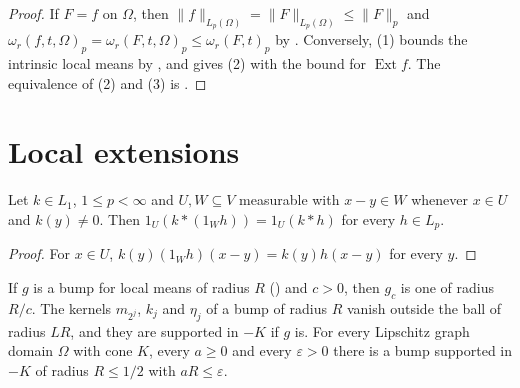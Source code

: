 \begin{proof}
\leanok
If $F = f$ on $\Omega$, then $\|f\|_{L_p(\Omega)} = \|F\|_{L_p(\Omega)} \leq \|F\|_p$ and
$\omega_r(f, t, \Omega)_p = \omega_r(F, t, \Omega)_p \leq \omega_r(F, t)_p$ by
. Conversely, (1) bounds the intrinsic local means by
, and  gives (2) with the bound for
$\operatorname{Ext} f$. The equivalence of (2) and (3) is .
\end{proof}

\section{Local extensions}

\begin{lemma}
\label{lem:support-principle-two}
\leanok
{}
Let $k \in L_1$, $1 \leq p < \infty$ and $U, W \subseteq V$ measurable with $x - y \in W$ whenever
$x \in U$ and $k(y) \neq 0$. Then $1_U (k * (1_W h)) = 1_U (k * h)$ for every $h \in L_p$.
\end{lemma}

\begin{proof}
\leanok
For $x \in U$, $k(y) (1_W h)(x - y) = k(y) h(x - y)$ for every $y$.
\end{proof}

\begin{lemma}
\label{lem:bumps-every-radius}
\leanok
{}
If $g$ is a bump for local means of radius $R$ () and $c > 0$, then $g_c$ is
one of radius $R/c$. The kernels $m_{2^j}$, $k_j$ and $\eta_j$ of a bump of radius $R$ vanish
outside the ball of radius $L R$, and they are supported in $-K$ if $g$ is. For every Lipschitz
graph domain $\Omega$ with cone $K$, every $a \geq 0$ and every $\varepsilon > 0$ there is a
bump supported in $-K$ of radius $R \leq 1/2$ with $a R \leq \varepsilon$.
\end{lemma}

